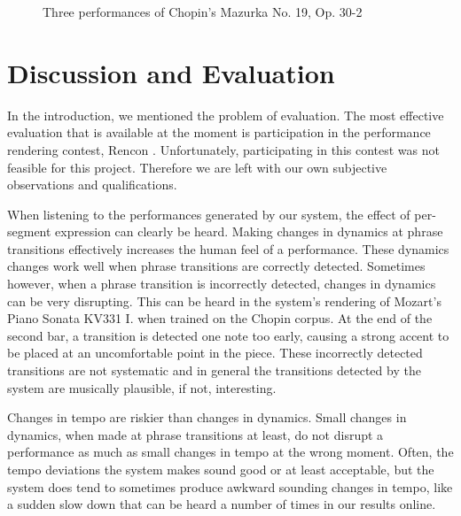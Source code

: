\documentclass[a4paper,10pt]{article}
\begin{document}
\begin{figure}
\centering
{}
\caption{Three performances of Chopin's Mazurka No. 19, Op. 30-2}
\label{fig:chopinperformances}
\end{figure}



\section{Discussion and Evaluation}
\label{sec:discussion}

In the introduction, we mentioned the problem of evaluation. The most effective evaluation that is available at the moment is participation in the performance rendering contest, Rencon \cite{hiraga2002rencon}. Unfortunately, participating in this contest was not feasible for this project. Therefore we are left with our own subjective observations and qualifications. 



When listening to the performances generated by our system, the effect of per-segment expression can clearly be heard. Making changes in dynamics at phrase transitions effectively increases the human feel of a performance. These dynamics changes work well when phrase transitions are correctly detected. Sometimes however, when a phrase transition is incorrectly detected, changes in dynamics can be very disrupting. This can be heard in the system's rendering of Mozart's Piano Sonata KV331 I. when trained on the Chopin corpus. At the end of the second bar, a transition is detected one note too early, causing a strong accent to be placed at an uncomfortable point in the piece. These incorrectly detected transitions are not systematic and in general the transitions detected by the system are musically plausible, if not, interesting.

Changes in tempo are riskier than changes in dynamics. Small changes in dynamics, when made at phrase transitions at least, do not disrupt a performance as much as small changes in tempo at the wrong moment. Often, the tempo deviations the system makes sound good or at least acceptable, but the system does tend to sometimes produce awkward sounding changes in tempo, like a sudden slow down that can be heard a number of times in our results online.
\end{document}
